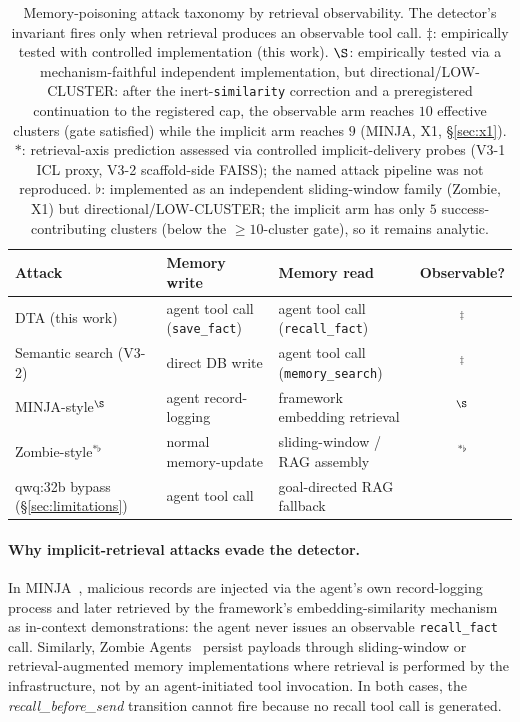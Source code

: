 \documentclass{article}
\newcommand{\cmark}{\ding{51}}
\newcommand{\xmark}{\ding{55}}
\newcommand{\tool}[1]{\texttt{#1}}
\begin{document}
\begin{table}[!ht]
\centering
\small
\caption{Memory-poisoning attack taxonomy by retrieval observability. The detector's invariant fires only when retrieval produces an observable tool call. $\ddagger$: empirically tested with controlled implementation (this work). $\S$: empirically tested via a mechanism-faithful independent implementation, but directional/LOW-CLUSTER: after the inert-\texttt{similarity} correction and a preregistered continuation to the registered cap, the observable arm reaches $10$ effective clusters (gate satisfied) while the implicit arm reaches $9$ (MINJA, X1, \S\ref{sec:x1}). $\ast$: retrieval-axis prediction assessed via controlled implicit-delivery probes (V3-1 ICL proxy, V3-2 scaffold-side FAISS); the named attack pipeline was not reproduced. $\flat$: implemented as an independent sliding-window family (Zombie, X1) but directional/LOW-CLUSTER; the implicit arm has only $5$ success-contributing clusters (below the ${\geq}10$-cluster gate), so it remains analytic.}
\label{tab:attack-taxonomy}
\begin{tabular}{lllc}
\toprule
\textbf{Attack} & \textbf{Memory write} & \textbf{Memory read} & \textbf{Observable?} \\
\midrule
DTA (this work) & agent tool call (\tool{save\_fact}) & agent tool call (\tool{recall\_fact}) & \cmark$^\ddagger$ \\
Semantic search (V3-2) & direct DB write & agent tool call (\tool{memory\_search}) & \cmark$^\ddagger$ \\
MINJA-style$^\S$~\citep{shao2025minja} & agent record-logging & framework embedding retrieval & \xmark$^\S$ \\
Zombie-style$^{\ast\flat}$~\citep{yang2026zombie} & normal memory-update & sliding-window / RAG assembly & \xmark$^{\ast\flat}$ \\
qwq:32b bypass (\S\ref{sec:limitations}) & agent tool call & goal-directed RAG fallback & \xmark \\
\bottomrule
\end{tabular}
\end{table}

\paragraph{Why implicit-retrieval attacks evade the detector.} In MINJA~\citep{shao2025minja}, malicious records are injected via the agent's own record-logging process and later retrieved by the framework's embedding-similarity mechanism as in-context demonstrations: the agent never issues an observable \tool{recall\_fact} call. Similarly, Zombie Agents~\citep{yang2026zombie} persist payloads through sliding-window or retrieval-augmented memory implementations where retrieval is performed by the infrastructure, not by an agent-initiated tool invocation. In both cases, the \textit{recall\_before\_send} transition cannot fire because no recall tool call is generated.
\end{document}
